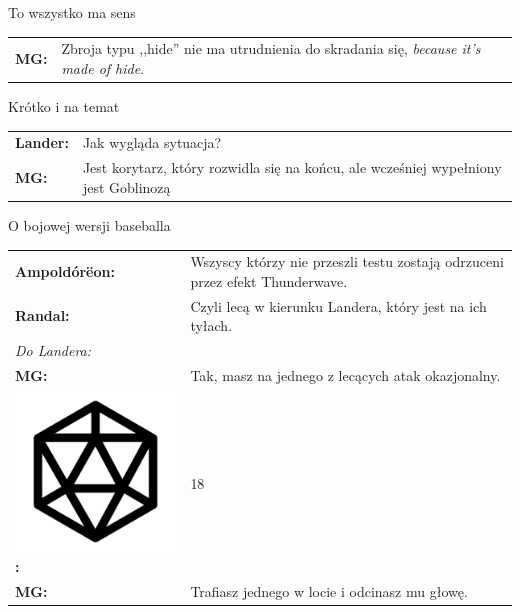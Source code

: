\documentclass[10pt,twoside,twocolumn]{book}
\begin{document}
\begin{rpg-quotebox}{To wszystko ma sens}
   \begin{tabularx}{\columnwidth}{lX}
      \textbf{MG:} & Zbroja typu ,,hide'' nie ma utrudnienia do skradania się, \emph{because it's made of hide}.\\
   \end{tabularx}
\end{rpg-quotebox}

\begin{rpg-quotebox}{Krótko i na temat}
   \begin{tabularx}{\columnwidth}{lX}
      \textbf{Lander:} & Jak wygląda sytuacja?\\
      \textbf{MG:} & Jest korytarz, który rozwidla się na końcu, ale wcześniej wypełniony jest Goblinozą\\
   \end{tabularx}
\end{rpg-quotebox}

\begin{rpg-quotebox}{O bojowej wersji baseballa}
   \begin{tabularx}{\columnwidth}{lX}
      \textbf{Ampoldórëon:} & Wszyscy którzy nie przeszli testu zostają odrzuceni przez efekt Thunderwave.\\
      \textbf{Randal:} & Czyli lecą w kierunku Landera, który jest na ich tyłach.\\
      \multicolumn{2}{l}{\textit{Do Landera:}}\\
      \textbf{MG:} & Tak, masz na jednego z lecących atak okazjonalny.\\
      \includegraphics[scale=0.06]{img/d20.png}\textbf{:}& 18\\
      \textbf{MG:} & Trafiasz jednego w locie i odcinasz mu głowę.\\
   \end{tabularx}
\end{rpg-quotebox}
\end{document}
